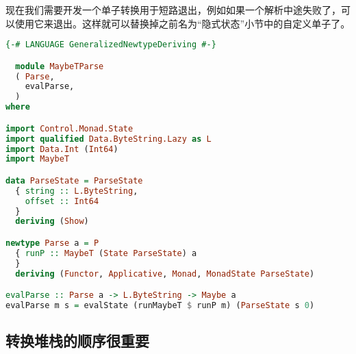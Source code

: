 \documentclass[./main.tex]{subfiles}
\begin{document}
现在我们需要开发一个单子转换用于短路退出，例如如果一个解析中途失败了，可以使用它来退出。这样就可以替换掉之前名为“隐式状态”小节中的自定义单子了。

\begin{lstlisting}[language=Haskell]
  {-# LANGUAGE GeneralizedNewtypeDeriving #-}

  module MaybeTParse
  ( Parse,
    evalParse,
  )
where

import Control.Monad.State
import qualified Data.ByteString.Lazy as L
import Data.Int (Int64)
import MaybeT

data ParseState = ParseState
  { string :: L.ByteString,
    offset :: Int64
  }
  deriving (Show)

newtype Parse a = P
  { runP :: MaybeT (State ParseState) a
  }
  deriving (Functor, Applicative, Monad, MonadState ParseState)

evalParse :: Parse a -> L.ByteString -> Maybe a
evalParse m s = evalState (runMaybeT $ runP m) (ParseState s 0)

\end{lstlisting}

\subsection*{转换堆栈的顺序很重要}


\begin{lstlisting}[language=Haskell]

\end{lstlisting}



\begin{lstlisting}[language=Haskell]

\end{lstlisting}



\begin{lstlisting}[language=Haskell]

\end{lstlisting}



\begin{lstlisting}[language=Haskell]

\end{lstlisting}



\begin{lstlisting}[language=Haskell]

\end{lstlisting}
\end{document}
